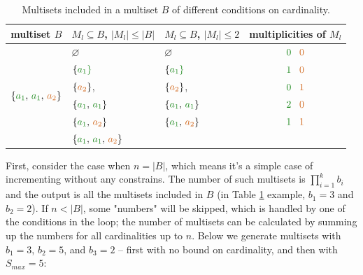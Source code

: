 \documentclass[11pt]{article}
\begin{document}
\begin{table}
  \centering
  \begin{tabular}{| c | l | l | c |}
    \hline
    \rowcolor{bg} 
      multiset $B$ & $M_l \subseteq B$, $|M_l| \leqslant |B|$ & 
                     $M_l \subseteq B$, $|M_l| \leqslant 2$   & 
                     multiplicities of $M_l$                                  \\
    \hline
    \multirow{6}{*}{$\{{\color{c1} a_1}, \, {\color{c1} a_1}, \, 
                       {\color{c2} a_2}\}$} 
    & $\varnothing$ & $\varnothing$ & ${\color{c1}0} \;\;\; {\color{c2}0}$    \\         & $\{\color{c1}a_1\}$ & $\{\color{c1}a_1\}$ 
    & ${\color{c1}1} \;\;\; {\color{c2}0}$                                    \\ 
    & $\{{\color{c2}a_2}\}$, & $\{{\color{c2}a_2}\}$, 
    & ${\color{c1}0} \;\;\; {\color{c2}1}$                                    \\ 
    & $\{{\color{c1}a_1}, \, {\color{c1}a_1}\}$  
    & $\{{\color{c1}a_1}, \, {\color{c1}a_1}\}$  
    & ${\color{c1}2} \;\;\; {\color{c2}0}$                                    \\           & $\{{\color{c1}a_1}, \, {\color{c2}a_2}\}$  
    & $\{{\color{c1}a_1}, \, {\color{c2}a_2}\}$ 
    & ${\color{c1} 1} \;\;\; {\color{c2} 1}$                                  \\  
    \cline{3-4}          
    & $\{{\color{c1}a_1}, \, {\color{c1}a_1}, \, {\color{c2}a_2}\}$ 
    & \cellcolor{Gainsboro} 
    & \cellcolor{Gainsboro}{${\color{c1}2} \;\;\; {\color{c2}1}$}             \\
    \hline    
  \end{tabular}
  \caption{Multisets included in a multiset $B$ of different conditions on cardinality.}
  \label{tab:ex2}
\end{table}  

First, consider the case when $n = |B|$, which means it's a simple case of incrementing without any constrains. The number of such multisets is $\prod_{i = 1}^k b_i$ and the output is all the multisets included in $B$ (in Table \ref{tab:ex2} example, $b_1 = 3$ and $b_2 = 2$). If $n < |B|$, some "numbers" will be skipped, which is handled by one of the conditions in the loop; the number of multisets can be calculated by summing up the numbers for all cardinalities up to $n$. Below we generate multisets with $b_1 = 3$, $b_2 = 5$, and $b_3 = 2$ -- first with no bound on cardinality, and then with $S_{max} = 5$:
      
\end{document}
